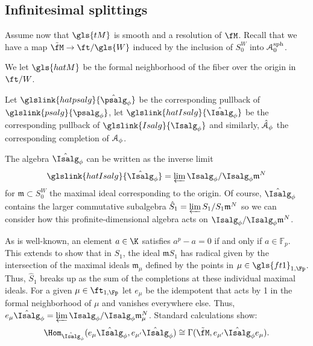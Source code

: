 \subsection{Infinitesimal splittings}

Assume now that $\gls{tM}$ is smooth and a resolution of $\fM$. Recall that we have a map $\tilde{\fM}\to \ft/\gls{W}$ induced by the inclusion of $S_0^W$ into
$\EuScript{A}_0^{\operatorname{sph}}$.
\begin{definition}
  We let $\gls{hatM}$ be the formal neighborhood of the fiber over the origin in $\ft/W$.

  Let $\glslink{hatpsalg}{\hat{\psalg}_\phi}$ %
  be the corresponding pullback of $ \glslink{psalg}{\psalg_\phi}$, let $\glslink{hatIsalg}{\hat{\Isalg}_\phi}$
  be the corresponding pullback of $ \glslink{Isalg}{\Isalg_\phi}$ and similarly, $\hat{\EuScript{A}}_\phi$ %
  the corresponding completion of $ \EuScript{A}_{\phi}$.
\end{definition}




The algebra $\hat{\Isalg}_\phi$ can be written as the inverse limit
\[\glslink{hatIsalg}{\hat{\Isalg}_\phi}=\varprojlim {\Isalg}_\phi/{\Isalg}_\phi\mathfrak{m}^N\] for
$\mathfrak{m}\subset S_0^W$ the maximal ideal corresponding to the
origin.  Of course, $\hat{\Isalg}_\phi$ contains the larger commutative
subalgebra $\hat{S}_1=\varprojlim {S}_1/{S}_1\mathfrak{m}^N$ so we can consider how this profinite-dimensional algebra acts on
${\Isalg}_\phi/{\Isalg}_\phi\mathfrak{m}^N$.

As is well-known, an element $a\in \K$ satisfies $a^p-a=0$ if and only if $a\in \mathbb{F}_p$.
This extends to show that in 
$S_1$, the ideal $\mathfrak{m}S_1$ has radical given by the intersection of the maximal ideals $\mathfrak{m}_{\mu}$ defined by the points in $\mu \in \gls{ft1}_{1,\Fp}$.  Thus, $\hat{S}_1$ breaks up as the sum of the completions at these individual maximal ideals.  For a given $\mu\in \ft_{1,\Fp}$ let $e_{\mu}$ be the idempotent that acts by 1 in the formal neighborhood of $\mu$ and vanishes everywhere else.  Thus, $e_{\mu}\hat{\Isalg}_\phi =\varprojlim \Isalg_\phi/  \Isalg_\phi \mathfrak{m}_{\mu}^N$.  Standard calculations show:
\begin{equation}\label{eq:summand-hom}
  \Hom_{\hat{\Isalg}_\phi}(e_{\mu}\hat{\Isalg}_\phi, e_{\mu'}\hat{\Isalg}_\phi)\cong \Gamma(\tilde{\fM}, e_{\mu'}\hat{\Isalg}_\phi e_{\mu}).  
\end{equation}

